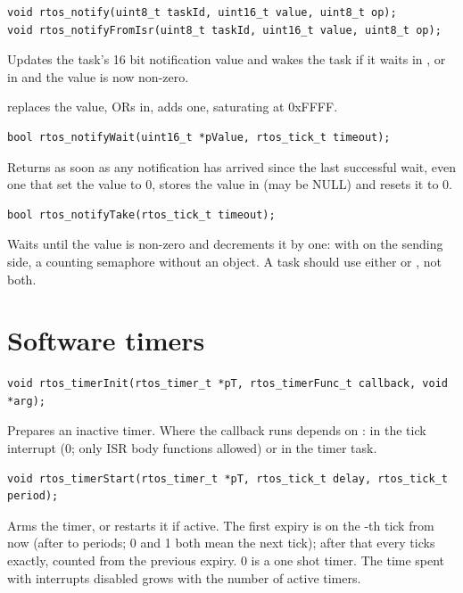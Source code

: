 \begin{lstlisting}
void rtos_notify(uint8_t taskId, uint16_t value, uint8_t op);
void rtos_notifyFromIsr(uint8_t taskId, uint16_t value, uint8_t op);
\end{lstlisting}
Updates the task's 16 bit notification value and wakes the task if it waits in
, or in  and the value is now non-zero.
\begin{apiparams}
\item[op]  replaces the value,  ORs
   in,  adds one, saturating at 0xFFFF.
\end{apiparams}

\begin{lstlisting}
bool rtos_notifyWait(uint16_t *pValue, rtos_tick_t timeout);
\end{lstlisting}
Returns as soon as any notification has arrived since the last successful wait, even one
that set the value to 0, stores the value in  (may be NULL) and resets it to 0.

\begin{lstlisting}
bool rtos_notifyTake(rtos_tick_t timeout);
\end{lstlisting}
Waits until the value is non-zero and decrements it by one: with
 on the sending side, a counting semaphore without an object. A
task should use either  or , not both.

\section{Software timers}

\begin{lstlisting}
void rtos_timerInit(rtos_timer_t *pT, rtos_timerFunc_t callback, void *arg);
\end{lstlisting}
Prepares an inactive timer. Where the callback runs depends on
: in the tick interrupt (0; only ISR body functions
allowed) or in the timer task.

\begin{lstlisting}
void rtos_timerStart(rtos_timer_t *pT, rtos_tick_t delay, rtos_tick_t period);
\end{lstlisting}
Arms the timer, or restarts it if active. The first expiry is on the -th tick
from now (after  to  periods; 0 and 1 both mean the next
tick); after that every  ticks exactly, counted from the previous expiry.
 0 is a one shot timer. The time spent with interrupts disabled grows with
the number of active timers.

